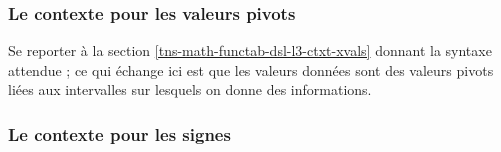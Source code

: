 

\subsubsection{Le contexte  pour les valeurs pivots}

Se reporter à la section \ref{tns-math-functab-dsl-l3-ctxt-xvals} donnant la syntaxe attendue ; ce qui échange ici est que les valeurs données sont des valeurs pivots liées aux intervalles sur lesquels on donne des informations.



\subsubsection{Le contexte  pour les signes}

